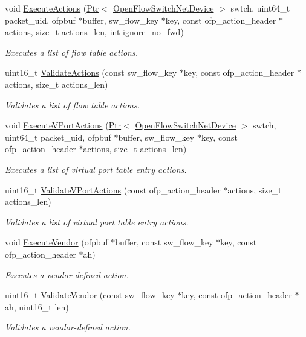 \begin{DoxyCompactItemize}
\item 
void \hyperlink{namespacens3_1_1ofi_a41439bdca06b08c85c61f73cd4225d6c}{Execute\+Actions} (\hyperlink{classns3_1_1Ptr}{Ptr}$<$ \hyperlink{classns3_1_1OpenFlowSwitchNetDevice}{Open\+Flow\+Switch\+Net\+Device} $>$ swtch, uint64\+\_\+t packet\+\_\+uid, ofpbuf $\ast$buffer, sw\+\_\+flow\+\_\+key $\ast$key, const ofp\+\_\+action\+\_\+header $\ast$actions, size\+\_\+t actions\+\_\+len, int ignore\+\_\+no\+\_\+fwd)
\begin{DoxyCompactList}\small\item\em Executes a list of flow table actions. \end{DoxyCompactList}\item 
uint16\+\_\+t \hyperlink{namespacens3_1_1ofi_a9a5a84fb06a171d0fd05b16db9c41fa6}{Validate\+Actions} (const sw\+\_\+flow\+\_\+key $\ast$key, const ofp\+\_\+action\+\_\+header $\ast$actions, size\+\_\+t actions\+\_\+len)
\begin{DoxyCompactList}\small\item\em Validates a list of flow table actions. \end{DoxyCompactList}\item 
void \hyperlink{namespacens3_1_1ofi_a1999c96e0e95bf97f38d42354e32a372}{Execute\+V\+Port\+Actions} (\hyperlink{classns3_1_1Ptr}{Ptr}$<$ \hyperlink{classns3_1_1OpenFlowSwitchNetDevice}{Open\+Flow\+Switch\+Net\+Device} $>$ swtch, uint64\+\_\+t packet\+\_\+uid, ofpbuf $\ast$buffer, sw\+\_\+flow\+\_\+key $\ast$key, const ofp\+\_\+action\+\_\+header $\ast$actions, size\+\_\+t actions\+\_\+len)
\begin{DoxyCompactList}\small\item\em Executes a list of virtual port table entry actions. \end{DoxyCompactList}\item 
uint16\+\_\+t \hyperlink{namespacens3_1_1ofi_afbc3596d5a0e9ab90dcf847634a892d3}{Validate\+V\+Port\+Actions} (const ofp\+\_\+action\+\_\+header $\ast$actions, size\+\_\+t actions\+\_\+len)
\begin{DoxyCompactList}\small\item\em Validates a list of virtual port table entry actions. \end{DoxyCompactList}\item 
void \hyperlink{namespacens3_1_1ofi_a753e0d0eb199cfc070d5bdbdaa05a5c5}{Execute\+Vendor} (ofpbuf $\ast$buffer, const sw\+\_\+flow\+\_\+key $\ast$key, const ofp\+\_\+action\+\_\+header $\ast$ah)
\begin{DoxyCompactList}\small\item\em Executes a vendor-\/defined action. \end{DoxyCompactList}\item 
uint16\+\_\+t \hyperlink{namespacens3_1_1ofi_a6661189048b3d19d7753e01bd90c0442}{Validate\+Vendor} (const sw\+\_\+flow\+\_\+key $\ast$key, const ofp\+\_\+action\+\_\+header $\ast$ah, uint16\+\_\+t len)
\begin{DoxyCompactList}\small\item\em Validates a vendor-\/defined action. \end{DoxyCompactList}\end{DoxyCompactItemize}


